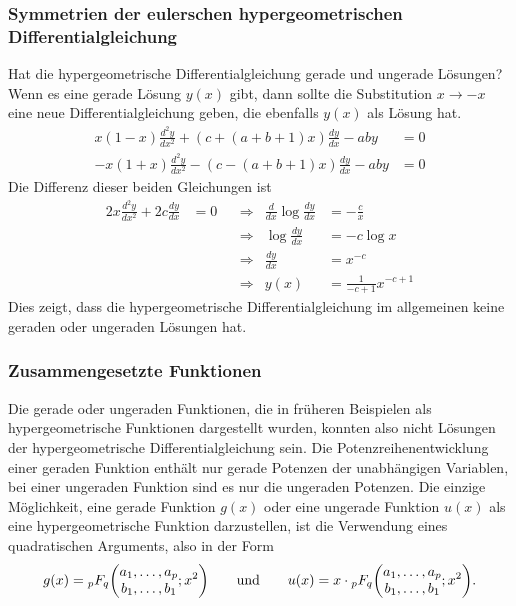 \subsubsection{Symmetrien der eulerschen hypergeometrischen
Differentialgleichung}
Hat die hypergeometrische Differentialgleichung gerade und
ungerade Lösungen?
Wenn es eine gerade Lösung $y(x)$ gibt, dann sollte die Substitution
$x \to -x$ eine neue Differentialgleichung geben, die ebenfalls $y(x)$
als Lösung hat.
\begin{align*}
 x(1-x)\frac{d^2y}{dx^2} + (c+(a+b+1)x)\frac{dy}{dx}-aby&=0
\\
-x(1+x)\frac{d^2y}{dx^2} - (c-(a+b+1)x)\frac{dy}{dx}-aby&=0
\end{align*}
Die Differenz dieser beiden Gleichungen ist
\begin{align*}
2x\frac{d^2y}{dx^2} +2c \frac{dy}{dx}&=0
&&\Rightarrow&
\frac{d}{dx} \log \frac{dy}{dx} &= -\frac{c}{x}
\\
&&&\Rightarrow&
\log \frac{dy}{dx} &= -c\log x
\\
&&&\Rightarrow&
\frac{dy}{dx} &= x^{-c}
\\
&&&\Rightarrow&
y(x) &= \frac{1}{-c+1}x^{-c+1}
\end{align*}
Dies zeigt, dass die hypergeometrische Differentialgleichung im
allgemeinen keine geraden oder ungeraden Lösungen hat.

\subsubsection{Zusammengesetzte Funktionen}
Die gerade oder ungeraden Funktionen, die in früheren Beispielen
als hypergeometrische Funktionen dargestellt wurden, konnten also
nicht Lösungen der hypergeometrische Differentialgleichung sein.
Die Potenzreihenentwicklung einer geraden Funktion enthält nur
gerade Potenzen der unabhängigen Variablen, bei einer ungeraden
Funktion sind es nur die ungeraden Potenzen.
Die einzige Möglichkeit, eine gerade Funktion $g(x)$ oder eine ungerade
Funktion $u(x)$  als eine hypergeometrische Funktion darzustellen,
ist die Verwendung eines quadratischen Arguments, also in der Form
\[
g(x)
=
\mathstrut_pF_q\biggl(\begin{matrix}a_1,\dots,a_p\\b_1,\dots,b_1\end{matrix};x^2\biggr)
\qquad\text{und}\qquad
u(x)
=
x\cdot
\mathstrut_pF_q\biggl(\begin{matrix}a_1,\dots,a_p\\b_1,\dots,b_1\end{matrix};x^2\biggr).
\]

